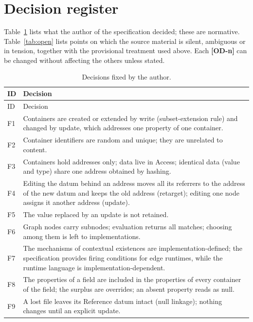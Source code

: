\documentclass[11pt,a4paper]{article}
\theoremstyle{definition}
\theoremstyle{plain}
\theoremstyle{remark}
\newcommand{\od}[1]{\textsf{\textbf{\textcolor{BrickRed}{[OD-#1]}}}}
\begin{document}
\section{Decision register}
\label{sec:register}

Table~\ref{tab:fixed} lists what the author of the specification decided; these are normative.
Table~\ref{tab:open} lists points on which the source material is silent, ambiguous or in tension, together with the provisional treatment used above.
Each \od{n} can be changed without affecting the others unless stated.

\begin{longtable}{@{}l p{}@{}}
\caption{Decisions fixed by the author.}\label{tab:fixed}\\
\toprule ID & Decision \\ \midrule \endfirsthead
\toprule ID & Decision \\ \midrule \endhead
F1 & Containers are created or extended by \textsf{write} (subset-extension rule) and changed by \textsf{update}, which addresses one property of one container.\\
F2 & Container identifiers are random and unique; they are unrelated to content.\\
F3 & Containers hold addresses only; data live in Access; identical data (value and type) share one address obtained by hashing.\\
F4 & Editing the datum behind an address moves all its referrers to the address of the new datum and keeps the old address (\textsf{retarget}); editing one node assigns it another address (\textsf{update}).\\
F5 & The value replaced by an \textsf{update} is not retained.\\
F6 & Graph nodes carry subnodes; evaluation returns all matches; choosing among them is left to implementations.\\
F7 & The mechanisms of contextual existences are implementation-defined; the specification provides firing conditions for edge runtimes, while the runtime language is implementation-dependent.\\
F8 & The properties of a field are included in the properties of every container of the field; the surplus are overrides; an absent property reads as null.\\
F9 & A lost file leaves its Reference datum intact (null linkage); nothing changes until an explicit \textsf{update}.\\

\end{longtable}
\end{document}
